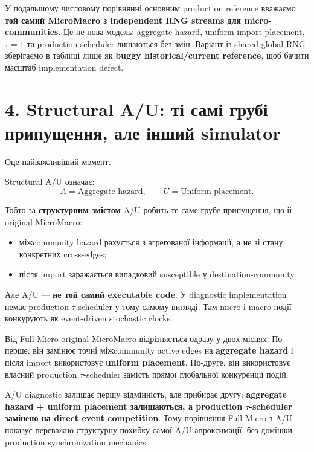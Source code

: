 \documentclass[11pt,a4paper]{article}
\begin{document}
\begin{tcolorbox}[colback=soft,colframe=macro,title=Базовий MicroMacro для порівнянь у v4]
У подальшому числовому порівнянні основним production reference вважаємо \textbf{той самий MicroMacro з independent RNG streams для micro-communities}. Це не нова модель: aggregate hazard, uniform import placement, $\tau=1$ та production scheduler лишаються без змін. Варіант із shared global RNG зберігаємо в таблиці лише як \textbf{buggy historical/current reference}, щоб бачити масштаб implementation defect.
\end{tcolorbox}

\section*{4. Structural A/U: ті самі грубі припущення, але інший simulator}

Оце найважливіший момент.

Structural A/U означає:
\[
 \boxed{A=\text{Aggregate hazard}},\qquad
 \boxed{U=\text{Uniform placement}}.
\]

Тобто за \textbf{структурним змістом} A/U робить те саме грубе припущення, що й original MicroMacro:
\begin{itemize}[nosep]
\item міжcommunity hazard рахується з агрегованої інформації, а не зі стану конкретних cross-edges;
\item після import заражається випадковий susceptible у destination-community.
\end{itemize}

Але A/U --- \textbf{не той самий executable code}. У diagnostic implementation немає production $\tau$-scheduler у тому самому вигляді. Там micro і macro події конкурують як event-driven stochastic clocks.

\begin{tcolorbox}[colback=soft,colframe=boundary,title=Навіщо взагалі потрібен A/U diagnostic?]
Від Full Micro original MicroMacro відрізняється одразу у двох місцях. По-перше, він замінює точні міжcommunity active edges на \textbf{aggregate hazard} і після import використовує \textbf{uniform placement}. По-друге, він використовує власний production $\tau$-scheduler замість прямої глобальної конкуренції подій.

A/U diagnostic залишає першу відмінність, але прибирає другу: \textbf{aggregate hazard + uniform placement залишаються, а production $\tau$-scheduler замінено на direct event competition}. Тому порівняння Full Micro з A/U показує переважно структурну похибку самої A/U-апроксимації, без домішки production synchronization mechanics.
\end{tcolorbox}
\end{document}
